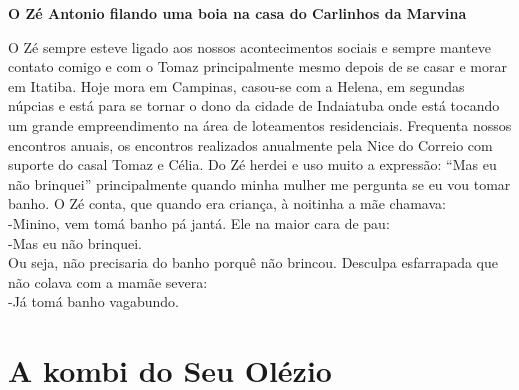 \documentclass[12pt,brazil,]{book}
\begin{document}
\textbf{O Zé Antonio filando uma boia na casa do Carlinhos da Marvina}

O Zé sempre esteve ligado aos nossos acontecimentos sociais e sempre
manteve contato comigo e com o Tomaz principalmente mesmo depois de se
casar e morar em Itatiba. Hoje mora em Campinas, casou-se com a Helena,
em segundas núpcias e está para se tornar o dono da cidade de Indaiatuba
onde está tocando um grande empreendimento na área de loteamentos
residenciais. Frequenta nossos encontros anuais, os encontros realizados
anualmente pela Nice do Correio com suporte do casal Tomaz e Célia. Do
Zé herdei e uso muito a expressão: ``Mas eu não brinquei''
principalmente quando minha mulher me pergunta se eu vou tomar banho. O
Zé conta, que quando era criança, à noitinha a mãe chamava:\\
-Minino, vem tomá banho pá jantá. Ele na maior cara de pau:\\
-Mas eu não brinquei.\\
Ou seja, não precisaria do banho porquê não brincou. Desculpa
esfarrapada que não colava com a mamãe severa:\\
-Já tomá banho vagabundo.

\section{A kombi do Seu Olézio}\label{a-kombi-do-seu-oluxe9zio}
\end{document}

